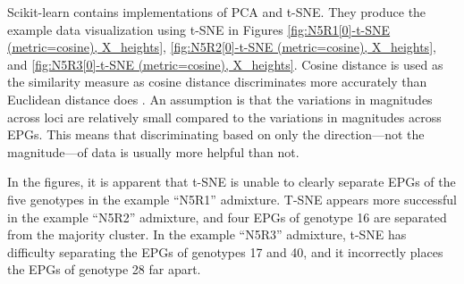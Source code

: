 Scikit-learn \cite{pedregosa_scikit-learn_2011} contains implementations of PCA and t-SNE. They produce the example data visualization using t-SNE in Figures \ref{fig:N5R1[0]-t-SNE (metric=cosine), X_heights}, \ref{fig:N5R2[0]-t-SNE (metric=cosine), X_heights}, and \ref{fig:N5R3[0]-t-SNE (metric=cosine), X_heights}. Cosine distance is used as the similarity measure as cosine distance discriminates more accurately than Euclidean distance does \cite{odonnell_clustering_2021}. An assumption is that the variations in magnitudes across loci are relatively small compared to the variations in magnitudes across EPGs. This means that discriminating based on only the direction---not the magnitude---of data is usually more helpful than not.

In the figures, it is apparent that t-SNE is unable to clearly separate EPGs of the five genotypes in the example ``N5R1'' admixture. T-SNE appears more successful in the example ``N5R2'' admixture, and four EPGs of genotype 16 are separated from the majority cluster. In the example ``N5R3'' admixture, t-SNE has difficulty separating the EPGs of genotypes 17 and 40, and it incorrectly places the EPGs of genotype 28 far apart.

